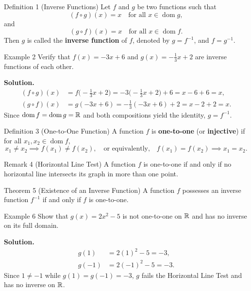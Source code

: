 \begin{definitionbox}{Definition 1 (Inverse Functions)}
Let \(f\) and \(g\) be two functions such that
\[
(f \circ g)(x) = x \quad \text{for all } x \in \operatorname{dom} g,
\]
and
\[
(g \circ f)(x) = x \quad \text{for all } x \in \operatorname{dom} f.
\]
Then \(g\) is called the \textbf{inverse function} of \(f\), denoted by \(g = f^{-1}\), and \(f = g^{-1}\).
\end{definitionbox}

\begin{examplebox}{Example 2}
Verify that \(f(x) = -3x + 6\) and \(g(x) = -\frac{1}{3}x + 2\) are inverse functions of each other.

\medskip
\textbf{Solution.}
\begin{align*}
(f \circ g)(x) &= f\bigl(-\tfrac{1}{3}x + 2\bigr) = -3\bigl(-\tfrac{1}{3}x + 2\bigr) + 6 = x - 6 + 6 = x, \\[4pt]
(g \circ f)(x) &= g(-3x + 6) = -\tfrac{1}{3}(-3x + 6) + 2 = x - 2 + 2 = x.
\end{align*}
Since \(\operatorname{dom} f = \operatorname{dom} g = \mathbb{R}\) and both compositions yield the identity, \(g = f^{-1}\).
\end{examplebox}

\begin{definitionbox}{Definition 3 (One-to-One Function)}
A function \(f\) is \textbf{one-to-one} (or \textbf{injective}) if for all \(x_1, x_2 \in \operatorname{dom} f\),
\[
x_1 \neq x_2 \implies f(x_1) \neq f(x_2), \quad \text{or equivalently,} \quad f(x_1) = f(x_2) \implies x_1 = x_2.
\]
\end{definitionbox}

\begin{remarkbox}{Remark 4 (Horizontal Line Test)}
A function \(f\) is one-to-one if and only if no horizontal line intersects its graph in more than one point.
\end{remarkbox}

\begin{theorembox}{Theorem 5 (Existence of an Inverse Function)}
A function \(f\) possesses an inverse function \(f^{-1}\) if and only if \(f\) is one-to-one.
\end{theorembox}

\begin{examplebox}{Example 6}
Show that \(g(x) = 2x^{2} - 5\) is not one-to-one on \(\mathbb{R}\) and has no inverse on its full domain.

\medskip
\textbf{Solution.}
\begin{align*}
g(1) &= 2(1)^2 - 5 = -3, \\
g(-1) &= 2(-1)^2 - 5 = -3.
\end{align*}
Since \(1 \neq -1\) while \(g(1) = g(-1) = -3\), \(g\) fails the Horizontal Line Test and has no inverse on \(\mathbb{R}\).
\end{examplebox}

